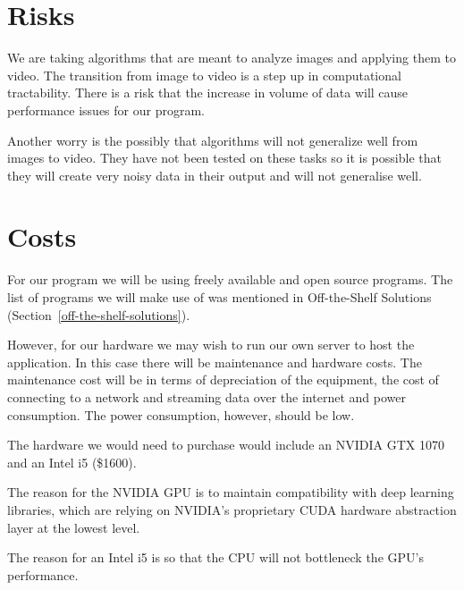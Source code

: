 \documentclass{scrreprt}
\begin{document}
\section{Risks}

{We are taking algorithms that are meant to analyze images and applying
them to video. The transition from image to video is a step up in
computational tractability. There is a risk that the increase in volume
of data will cause performance issues for our program.}

{Another worry is the possibly that algorithms will not generalize well
from images to video. They have not been tested on these tasks so it is
possible that they will create very noisy data in their output and will
not generalise well.}

\section{Costs}

{For our program we will be using freely available and open source programs.
The list of programs we will make use of was mentioned in Off-the-Shelf
Solutions (Section~\ref{off-the-shelf-solutions}).}

{However, for our hardware we may wish to run our own server to host the
application. In this case there will be maintenance and hardware costs.  The
maintenance cost will be in terms of depreciation of the equipment, the cost of
connecting to a network and streaming data over the internet and power
consumption. The power consumption, however, should be low.}

The hardware we would need to purchase would include an NVIDIA GTX 1070 and an
Intel i5 (\$1600).

The reason for the NVIDIA GPU is to maintain compatibility with deep learning
libraries, which are relying on NVIDIA's proprietary CUDA hardware abstraction
layer at the lowest level.

The reason for an Intel i5 is so that the CPU will not bottleneck the GPU's
performance.
\end{document}
